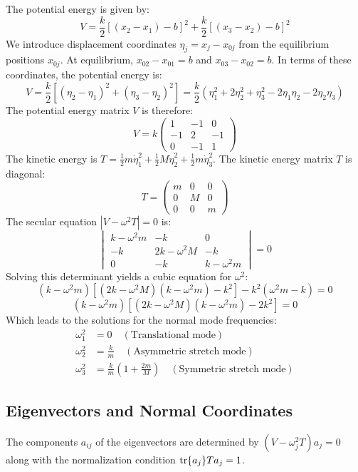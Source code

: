 \documentclass[12pt]{article}
\begin{document}
	The potential energy is given by:
	\[
	V = \frac{k}{2} [(x_2-x_1)-b]^2 + \frac{k}{2} [(x_3-x_2)-b]^2
	\]
	We introduce displacement coordinates $\eta_j = x_j - x_{0j}$ from the equilibrium positions $x_{0j}$. At equilibrium, $x_{02}-x_{01}=b$ and $x_{03}-x_{02}=b$.
	In terms of these coordinates, the potential energy is:
	\[
	V = \frac{k}{2} [(\eta_2 - \eta_1)^2 + (\eta_3 - \eta_2)^2] = \frac{k}{2} (\eta_1^2 + 2\eta_2^2 + \eta_3^2 - 2\eta_1\eta_2 - 2\eta_2\eta_3)
	\]
	The potential energy matrix $V$ is therefore:
	\[
	V = k
	\begin{pmatrix}
		1 & -1 & 0 \\
		-1 & 2 & -1 \\
		0 & -1 & 1
	\end{pmatrix}
	\]
	The kinetic energy is $T = \frac{1}{2} m\dot{\eta}_1^2 + \frac{1}{2} M\dot{\eta}_2^2 + \frac{1}{2} m\dot{\eta}_3^2$. The kinetic energy matrix $T$ is diagonal:
	\[
	T =
	\begin{pmatrix}
		m & 0 & 0 \\
		0 & M & 0 \\
		0 & 0 & m
	\end{pmatrix}
	\]
	The secular equation $|V - \omega^2 T|=0$ is:
	\[
	\begin{vmatrix}
		k-\omega^2 m & -k & 0 \\
		-k & 2k-\omega^2 M & -k \\
		0 & -k & k-\omega^2 m
	\end{vmatrix}
	= 0
	\]
	Solving this determinant yields a cubic equation for $\omega^2$:
	\[
	(k-\omega^2 m) [(2k-\omega^2 M)(k-\omega^2 m) - k^2] - k^2(\omega^2 m - k) = 0
	\]
	\[
	(k-\omega^2 m) \left[ (2k-\omega^2 M)(k-\omega^2 m) - 2k^2 \right] = 0
	\]
	Which leads to the solutions for the normal mode frequencies:
	\begin{align*}
		\omega_1^2 &= 0 \quad (\text{Translational mode}) \\
		\omega_2^2 &= \frac{k}{m} \quad (\text{Asymmetric stretch mode}) \\
		\omega_3^2 &= \frac{k}{m} \left( 1 + \frac{2m}{M} \right) \quad (\text{Symmetric stretch mode})
	\end{align*}
	
	\subsection*{Eigenvectors and Normal Coordinates}
	The components $a_{ij}$ of the eigenvectors are determined by $(V - \omega_j^2 T)a_j = 0$ along with the normalization condition $\tr{a_j} T a_j = 1$.
	
\end{document}

